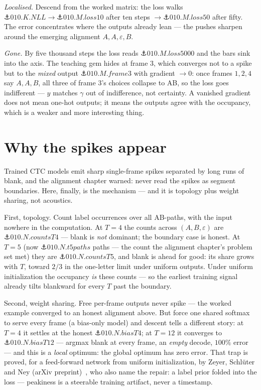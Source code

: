 \begin{narrative}
\emph{Localised.} Descend from the worked matrix: the loss walks
$\anchor{010.K.NLL} \to \anchor{010.M.loss10}$ after ten steps
$\to \anchor{010.M.loss50}$ after fifty. The error concentrates
where the outputs already lean — the pushes sharpen around the
emerging alignment $A, A, \varepsilon, B$.

\emph{Gone.} By five thousand steps the loss reads
$\anchor{010.M.loss5000}$ and the bars sink into the axis. The
teaching gem hides at frame $3$, which converges not to a spike but
to the \emph{mixed} output $\anchor{010.M.frame3}$ with gradient
$\to 0$: once frames $1, 2, 4$ say $A, A, B$, all three of frame
$3$'s choices collapse to AB, so the loss goes indifferent — $y$
matches $\gamma$ out of indifference, not certainty. A vanished
gradient does not mean one-hot outputs; it means the outputs agree
with the occupancy, which is a weaker and more interesting thing.

\section{Why the spikes appear}

Trained CTC models emit sharp single-frame spikes separated by long
runs of blank, and the alignment chapter warned: never read the
spikes as segment boundaries. Here, finally, is the mechanism — and
it is topology plus weight sharing, not acoustics.

First, topology. Count label occurrences over all AB-paths, with the
input nowhere in the computation. At $T = 4$ the counts across
$(A, B, \varepsilon)$ are $\anchor{010.N.countsT4}$ — blank is
\emph{not} dominant; the boundary case is honest. At $T = 5$ (now
$\anchor{010.N.t5paths}$ paths — the count the alignment chapter's
problem set met) they are $\anchor{010.N.countsT5}$, and blank is
ahead for good: its share grows with $T$, toward $2/3$ in the
one-letter limit under uniform outputs. Under uniform initialization
the occupancy \emph{is} these counts — so the earliest training
signal already tilts blankward for every $T$ past the boundary.

Second, weight sharing. Free per-frame outputs never spike — the
worked example converged to an honest alignment above. But force one
shared softmax to serve every frame (a bias-only model) and descent
tells a different story: at $T = 4$ it settles at the honest
$\anchor{010.N.biasT4}$; at $T = 12$ it converges to
$\anchor{010.N.biasT12}$ — argmax blank at every frame, an
\emph{empty} decode, $100\%$ error — and this is a \emph{local}
optimum: the global optimum has zero error. That trap is proved, for
a feed-forward network from uniform initialization, by Zeyer,
Schl\"uter and Ney (arXiv
preprint)~\cite{deep_learning-zeyer-et-al-2021-why-does-ctc-result-in-peaky-behavior},
who also name the repair: a label prior folded into the loss —
peakiness is a steerable training artifact, never a timestamp.


\end{narrative}
